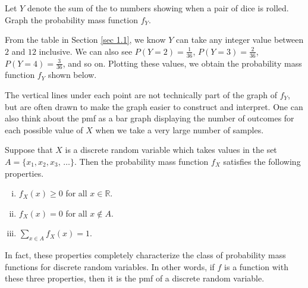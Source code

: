 \begin{examp} Let $Y$ denote the sum of the to numbers showing when a pair of dice is rolled. Graph the probability mass function $f_Y$.
\par
\noindent
From the table in Section \ref{sec 1.1}, we know $Y$ can take any integer value between $2$ and $12$ inclusive. We can also see $P(Y = 2) = \frac{1}{36}$, $P(Y = 3) = \frac{2}{36}$, $P(Y = 4) = \frac{3}{36}$, and so on. Plotting these values, we obtain the probability mass function $f_Y$ shown below.
\begin{center}
\end{center}
\end{examp} 
\par
The vertical lines under each point are not technically part of the graph of $f_Y$, but are often drawn to make the graph easier to construct and interpret. One can also think about the pmf as a bar graph displaying the number of outcomes for each possible value of $X$ when we take a very large number of samples.
\par
\begin{prop}\label{pmfproperties} Suppose that $X$ is a discrete random variable which takes values in the set $A = \{x_1, x_2, x_3, \, \dots\}$. Then the probability mass function $f_X$ satisfies the following properties.
\vspace{-0.5em}
\begin{enumerate}[(i)]
\item $f_X(x) \geq 0$ for all $x \in \mathbb{R}$.
\item $f_X(x) = 0$ for all $x \not\in A$.
\item $\sum_{x \in A} f_X(x) = 1$.
\end{enumerate}
\end{prop}
\par
In fact, these properties completely characterize the class of probability mass functions for discrete random variables. In other words, if $f$ is a function with these three properties, then it is the pmf of a discrete random variable.

